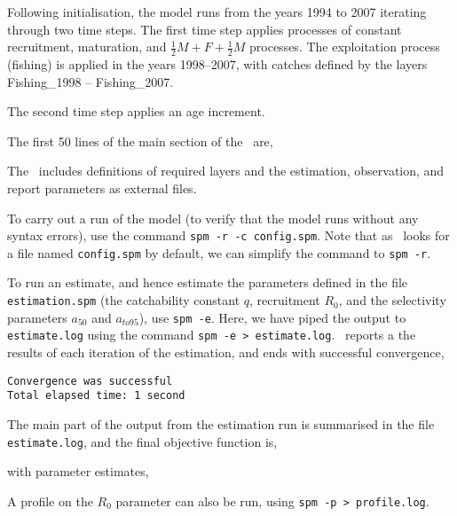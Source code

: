 Following initialisation, the model runs from the years 1994 to 2007 iterating through two time steps. The first time step applies processes of constant recruitment, maturation, and  $\frac{1}{2} M + F + \frac{1}{2} M$ processes. The exploitation process (fishing) is applied in the years 1998--2007, with catches defined by the layers Fishing\_1998 -- Fishing\_2007. 

The second time step applies an age increment.

The first 50 lines of the main section of the \config\ are,
 

The \config\ includes definitions of required layers and the estimation, observation, and report parameters as external files.

To carry out a run of the model (to verify that the model runs without any syntax errors), use the command \texttt{spm -r -c config.spm}. Note that as \SPM\ looks for a file named \texttt{config.spm} by default, we can simplify the command to \texttt{spm -r}. 

To run an estimate, and hence estimate the parameters defined in the file \texttt{estimation.spm} (the catchability constant $q$, recruitment $R_0$, and the selectivity parameters $a_{50}$ and $a_{to95}$), use  \texttt{spm -e}. Here, we have piped the output to \texttt{estimate.log} using the command \texttt{spm -e > estimate.log}.  \SPM\ reports a the results of each iteration of the estimation, and ends with successful convergence,
\begin{verbatim}
Convergence was successful
Total elapsed time: 1 second
\end{verbatim}

The main part of the output from the estimation run is summarised in the file \texttt{estimate.log}, and the final objective function is,
 
with parameter estimates,
 

A profile on the $R_0$ parameter can also be run, using \texttt{spm -p > profile.log}.
